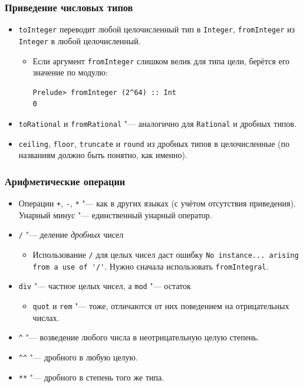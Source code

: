 \documentclass[10pt]{beamer}
\begin{document}
\begin{frame}[fragile]
\frametitle{Приведение числовых типов}
\begin{itemize}
    \item \lstinline|toInteger| переводит любой целочисленный тип в \lstinline|Integer|, \lstinline|fromInteger| из \lstinline|Integer| в любой целочисленный.
    \begin{itemize}
        \item Если аргумент \lstinline|fromInteger| слишком велик для типа цели, берётся его значение по модулю:
        \begin{lstlisting}
Prelude> fromInteger (2^64) :: Int
0
\end{lstlisting}
    \end{itemize}
    \item \lstinline|toRational| и \lstinline|fromRational| "--- аналогично для \lstinline|Rational| и дробных типов.
    \item \lstinline|ceiling|, \lstinline|floor|, \lstinline|truncate| и \lstinline|round| из дробных типов в целочисленные (по названиям должно быть понятно, как именно).
\end{itemize}
\end{frame}

\begin{frame}[fragile]
\frametitle{Арифметические операции}
\begin{itemize}
    \item Операции \lstinline|+|, \lstinline|-|, \lstinline|*| "--- как в других языках (с учётом отсутствия приведения).
    Унарный минус "--- единственный унарный оператор.
    \item \lstinline|/| "--- деление \emph{дробных} чисел
    \begin{itemize}
        \item Использование \lstinline|/| для целых чисел даст ошибку \lstinline|No instance... arising from a use of '/'|. Нужно сначала использовать \lstinline|fromIntegral|.
    \end{itemize}        
    \item \lstinline|div| "--- частное целых чисел, а \lstinline|mod| "--- остаток
    \begin{itemize}
        \item
 \lstinline|quot| и \lstinline|rem| "--- тоже, отличаются от них поведением на отрицательных числах.
    \end{itemize}        
   \item \lstinline|^| "--- возведение любого числа в неотрицательную  целую степень. 
       \item \lstinline|^^| "--- дробного в любую целую. \item \lstinline|**| "--- дробного в степень того же типа.
\end{itemize}
\end{frame}
\end{document}
